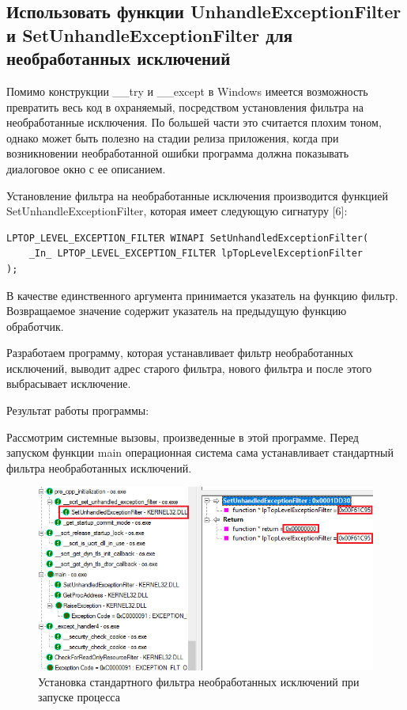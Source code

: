 \documentclass[14pt,a4paper,report]{report}
\begin{document}
\subsection{Использовать функции UnhandleExceptionFilter и SetUnhandleExceptionFilter для необработанных исключений}

Помимо конструкции \_\_try и \_\_except в Windows имеется возможность превратить весь код в охраняемый, посредством установления фильтра на необработанные исключения. По большей части это считается плохим тоном, однако может быть полезно на стадии релиза приложения, когда при возникновении необработанной ошибки программа должна показывать диалоговое окно с ее описанием.

Установление фильтра на необработанные исключения производится функцией SetUnhandleExceptionFilter, которая имеет следующую сигнатуру [6]:

\begin{lstlisting}
LPTOP_LEVEL_EXCEPTION_FILTER WINAPI SetUnhandledExceptionFilter(
    _In_ LPTOP_LEVEL_EXCEPTION_FILTER lpTopLevelExceptionFilter
);
\end{lstlisting}

В качестве единственного аргумента принимается указатель на функцию фильтр. Возвращаемое значение содержит указатель на предыдущую функцию обработчик.

Разработаем программу, которая устанавливает фильтр необработанных исключений, выводит адрес старого фильтра, нового фильтра и после этого выбрасывает исключение.



Результат работы программы:



Рассмотрим системные вызовы, произведенные в этой программе. Перед запуском функции main операционная система сама устанавливает стандартный фильтра необработанных исключений.

\begin{figure}[h!]
	\centering
	\includegraphics[scale = 0.92]{images/5_1.png}
	\caption{Установка стандартного фильтра необработанных исключений при запуске процесса}
\end{figure}
\end{document}

